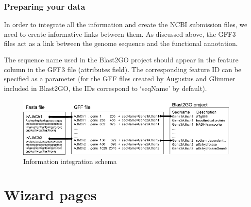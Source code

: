 \subsubsection{Preparing your data}
 
In order to integrate all the information and create the NCBI submission
files, we need to create informative links between them. As discussed above, the
GFF3 files act as a link between the genome sequence and the functional
annotation.

The sequence name used in the Blast2GO project should appear in
the feature column in the GFF3 file (attributes field). The corresponding feature ID can be specified
as a parameter (for the GFF files created by Augustus and Glimmer included in
Blast2GO, the IDs correspond to `seqName' by default).


\begin{figure}[!h] \centering
\includegraphics[width=\textwidth]{img/Submission_links.png}
\caption{Information integration schema}
\label{fig:ncbisublinkfiles}
\end{figure}


\section{Wizard pages}
